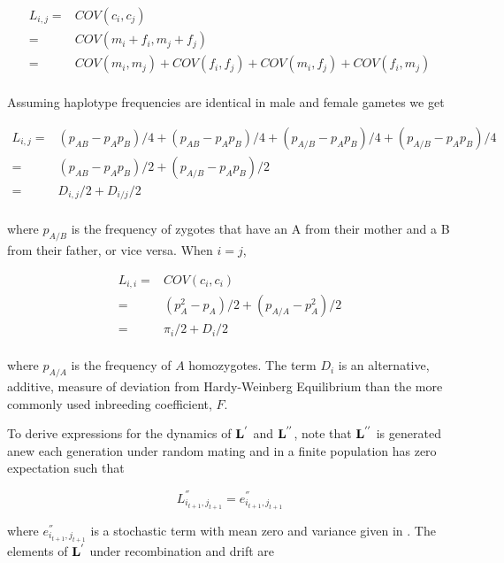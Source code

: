 \documentclass[12pt]{article}
\begin{document}
\begin{bibunit}
\begin{equation}
\begin{array}{rl}
L_{i,j} =& COV(c_i, c_j)\\
        =& COV(m_i+f_i,  m_j+f_j)\\
        =& COV(m_i,  m_j)+COV(f_i,f_j)+COV(m_i,  f_j)+COV(f_i,  m_j)\\
\end{array}
\end{equation}

Assuming haplotype frequencies are identical in male and female gametes we get

\begin{equation}
\begin{array}{rl}
L_{i,j} =& (p_{AB}-p_{A}p_{B})/4+(p_{AB}-p_{A}p_{B})/4+(p_{A/B}-p_{A}p_{B})/4+(p_{A/B}-p_{A}p_{B})/4\\
=& (p_{AB}-p_{A}p_{B})/2+(p_{A/B}-p_{A}p_{B})/2\\
=& D_{i,j}/2+D_{i/j}/2\\
\end{array}
\end{equation}

where $p_{A/B}$ is the frequency of zygotes that have an A from their mother and a B from their father, or vice versa.  When $i=j$,

\begin{equation}
\begin{array}{rl}
L_{i,i} =& COV(c_i, c_i)\\
=& (p_{A}^2-p_{A})/2+(p_{A/A}-p_{A}^2)/2\\
=& \pi_i/2+D_{i}/2\\
\end{array}
\end{equation}

where $p_{A/A}$ is the frequency of $A$ homozygotes. The term $D_i$ is an alternative, additive, measure of deviation from Hardy-Weinberg Equilibrium than the more commonly used inbreeding coefficient, $F$. 

To derive expressions for the dynamics of ${\bf L}^{'}$ and ${\bf L}^{''}$, note that ${\bf L}^{''}$ is generated anew each generation under random mating and in a finite population has zero expectation such that

\begin{equation}
L^{''}_{i_{t+1}, j_{t+1}} = e^{''}_{i_{t+1}, j_{t+1}}
\end{equation}

where $e^{''}_{i_{t+1}, j_{t+1}}$ is a stochastic term with mean zero and variance given in \citet{Weir.1996}. The elements of ${\bf L}^{'}$ under recombination and drift are \citep{Hill.1968, Santiago.1998}


\end{bibunit}
\end{document}
